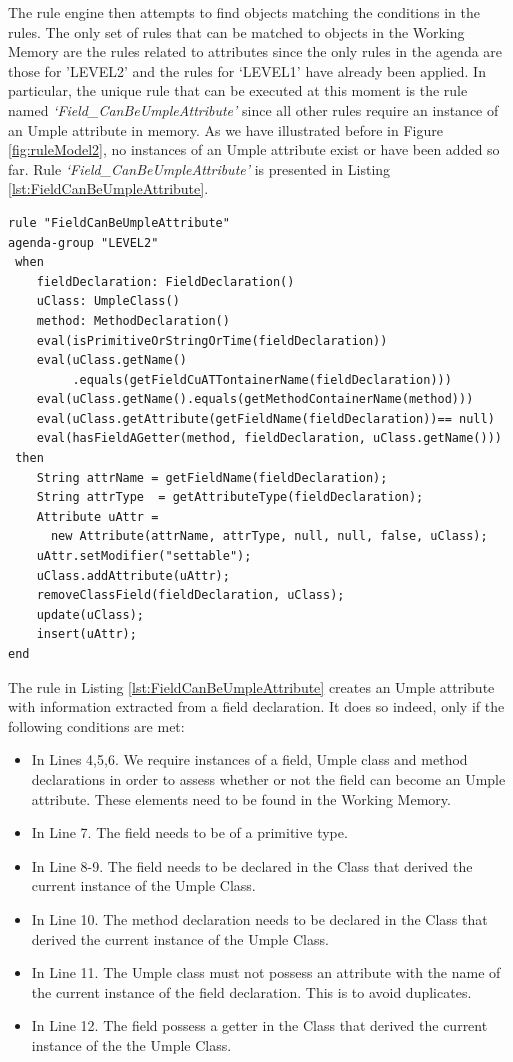 The rule engine then attempts to find objects matching the conditions in the rules. The only set of rules that can be matched to objects in the Working Memory are the rules related to attributes since the only rules in the agenda are those for 'LEVEL2' and the rules for `LEVEL1' have already been applied. In particular, the unique rule
that can be executed at this moment is the rule named \textit{`Field\_CanBeUmpleAttribute'} since all other rules require an instance of an Umple attribute in memory. As we have illustrated before in Figure \ref{fig:ruleModel2}, no instances of an Umple attribute exist or have been added so far. Rule \textit{`Field\_CanBeUmpleAttribute'} is presented in Listing \ref{lst:FieldCanBeUmpleAttribute}.

\begin{lstlisting}[language={drools},label=lst:FieldCanBeUmpleAttribute, caption=Rule  FieldCanBeUmpleAttribute]
rule "FieldCanBeUmpleAttribute"
agenda-group "LEVEL2" 
 when
	fieldDeclaration: FieldDeclaration()
	uClass: UmpleClass()
	method: MethodDeclaration()
	eval(isPrimitiveOrStringOrTime(fieldDeclaration))				   
	eval(uClass.getName()
	     .equals(getFieldCuATTontainerName(fieldDeclaration)))
	eval(uClass.getName().equals(getMethodContainerName(method)))
	eval(uClass.getAttribute(getFieldName(fieldDeclaration))== null)
	eval(hasFieldAGetter(method, fieldDeclaration, uClass.getName()))
 then 
	String attrName = getFieldName(fieldDeclaration);
	String attrType  = getAttributeType(fieldDeclaration);
	Attribute uAttr = 
	  new Attribute(attrName, attrType, null, null, false, uClass);
	uAttr.setModifier("settable");
	uClass.addAttribute(uAttr);
	removeClassField(fieldDeclaration, uClass);
	update(uClass);    	
	insert(uAttr);
end
\end{lstlisting}

The rule in Listing \ref{lst:FieldCanBeUmpleAttribute} creates an Umple attribute with information extracted from a field declaration. It does so indeed, only if the following conditions are met:
\begin{itemize}
\item In Lines 4,5,6. We require instances of a field, Umple class and method declarations in order to assess whether or not the field can become an Umple attribute. These elements need to be found in the Working Memory. 
\item In Line 7. The field needs to be of a primitive type.
\item In Line 8-9. The field needs to be declared in the Class that derived the current instance of the Umple Class.
\item In Line 10. The method declaration needs to be declared in the Class that derived the current instance of the Umple Class.
\item In Line 11. The Umple class must not possess an attribute with the name of the current instance of the field declaration. This is to avoid duplicates.
\item In Line 12. The field possess a getter in the Class that derived the current instance of the the Umple Class.
\end{itemize}

